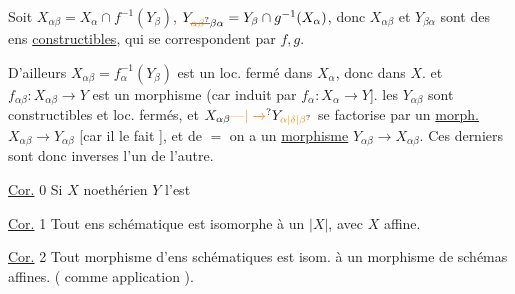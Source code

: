 
Soit $X_{\alpha\beta}=X_\alpha\cap f^{-1}(Y_\beta)$, $Y_{\deleted{\unsure{\alpha\beta}}\beta\alpha}=Y_\beta\cap g^{-1}(X_\alpha)$, donc $X_{\alpha\beta}$ et $Y_{\beta\alpha}$ sont des ens \uline{constructibles}, qui se correspondent par $f,g$.



D'ailleurs $X_{\alpha\beta}=f_\alpha^{-1}(Y_\beta)$ est un  loc. fermé dans $X_\alpha$, donc dans $X$. et $f_{\alpha\beta}:X_{\alpha\beta}\to Y$ est un morphisme  (car induit par $f_\alpha:X_\alpha\to Y$].  les $Y_{\alpha\beta}$ sont constructibles et loc. fermés, et   $X_{\alpha\beta}\unsure{\text{---}|\to}Y_{\unsure{\alpha|\delta|\beta}}$ se factorise par un \uline{morph.} $X_{\alpha\beta}\to Y_{\alpha\beta}$ [car il le fait ], et de $=$ on a un \uline{morphisme} $Y_{\alpha\beta}\to X_{\alpha\beta}$. Ces derniers sont donc inverses l'un de l'autre.

\uline{Cor.} 0 Si $X$ noethérien $Y$ l'est

\uline{Cor.} 1 Tout ens schématique est isomorphe à un $|X|$, avec $X$ affine.

\uline{Cor.} 2 Tout morphisme d'ens schématiques est isom. à un morphisme de  schémas affines. ( comme application ).

